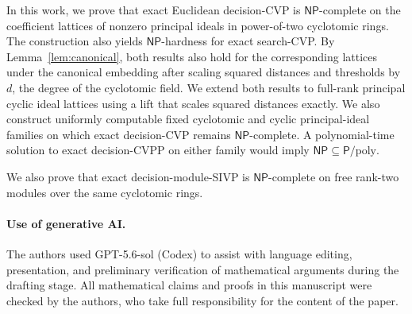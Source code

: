\documentclass[11pt]{article}
\theoremstyle{definition}
\newcommand{\NP}{\mathsf{NP}}
\newcommand{\Ppoly}{\mathsf{P}/\mathrm{poly}}
\begin{document}
In this work, we prove that exact Euclidean decision-CVP is
\(\NP\)-complete on the
coefficient lattices of nonzero principal ideals in power-of-two cyclotomic
rings.  The construction also yields \(\NP\)-hardness for exact search-CVP.
By Lemma~\ref{lem:canonical}, both results also hold for the
corresponding lattices under the canonical embedding after scaling squared
distances and thresholds by \(d\), the degree of the cyclotomic field.
We extend both results to full-rank principal cyclic ideal lattices using a
lift that scales squared distances exactly.  We also
construct uniformly
computable fixed cyclotomic and cyclic principal-ideal families on which
exact decision-CVP remains \(\NP\)-complete.  A polynomial-time solution to
exact decision-CVPP on either family would imply \(\NP\subseteq\Ppoly\).

\ifdefined\withModuleSIVP
{We also prove that exact decision-module-SIVP is
\(\NP\)-complete on free rank-two modules over the same cyclotomic rings.}
\fi


\paragraph{Use of generative AI.}
The authors used GPT-5.6-sol (Codex) to assist with language
editing, presentation, and preliminary verification of mathematical
arguments during the drafting stage.  All mathematical
claims and proofs in this manuscript were checked by the authors, who take full
responsibility for the content of the paper.


\small


\end{document}

